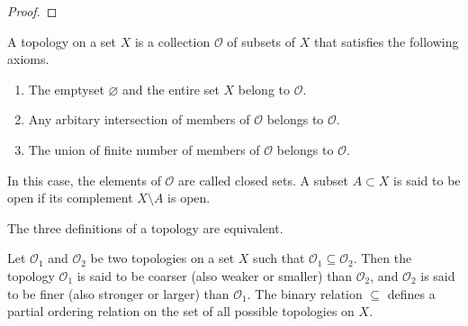 %
\begin{proof}
    
\end{proof}
%
\begin{defboxlight}
    \begin{definition}
        A topology on a set \(X\) is a collection \(\mathcal{O}\) of subsets of \(X\) that satisfies the following axioms.
        \begin{enumerate}
            \item The emptyset \(\varnothing\) and the entire set \(X\) belong to \(\mathcal{O}\).
            \item Any arbitary intersection of members of \(\mathcal{O}\) belongs to \(\mathcal{O}\).
            \item The union of finite number of members of \(\mathcal{O}\) belongs to \(\mathcal{O}\).
        \end{enumerate}
        In this case, the elements of \(\mathcal{O}\) are called closed sets. A subset \(A \subset X\) is said to be open if its complement \(X \setminus A\) is open.
    \end{definition}
\end{defboxlight}
%
\begin{defboxlight}
    \begin{definition}
        
    \end{definition}
\end{defboxlight}
%
\begin{thmbox}
    \begin{proposition}
        The three definitions of a topology are equivalent.
    \end{proposition}
\end{thmbox}
%
\begin{defbox}
    \begin{definition}
        Let \(\mathcal{O}_1\) and \(\mathcal{O}_2\) be two topologies on a set \(X\) such that \(\mathcal{O}_1 \subseteq \mathcal{O}_2\). Then the topology \(\mathcal{O}_1\) is said to be coarser (also weaker or smaller) than \(\mathcal{O}_2\), and \(\mathcal{O}_2\) is said to be finer (also stronger or larger) than \(\mathcal{O}_1\). The binary relation \(\subseteq\) defines a partial ordering relation on the set of all possible topologies on \(X\).
    \end{definition}
\end{defbox}

